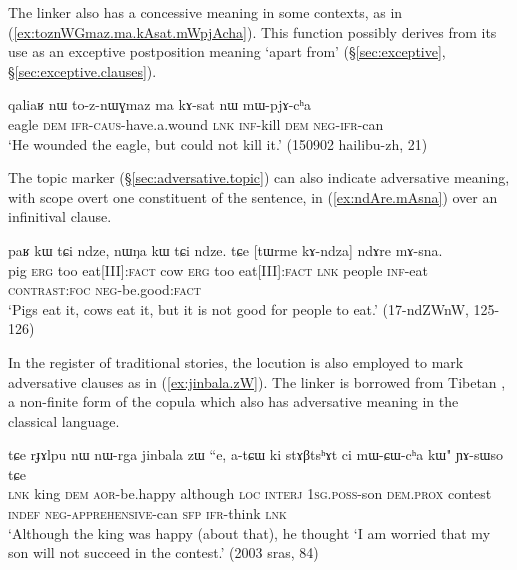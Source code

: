  The linker  also has a concessive meaning in some contexts, as in (\ref{ex:toznWGmaz.ma.kAsat.mWpjAcha}). This function possibly derives from its use as an exceptive postposition meaning `apart from' (§\ref{sec:exceptive}, §\ref{sec:exceptive.clauses}).
 
\begin{exe}
\ex \label{ex:toznWGmaz.ma.kAsat.mWpjAcha}
\gll qaliaʁ nɯ to-z-nɯɣmaz ma kɤ-sat nɯ mɯ-pjɤ-cʰa\\
eagle \textsc{dem} \textsc{ifr}-\textsc{caus}-have.a.wound \textsc{lnk} \textsc{inf}-kill \textsc{dem} \textsc{neg}-\textsc{ifr}-can\\
\glt `He wounded the eagle, but could not kill it.' (150902 hailibu-zh, 21)
\end{exe}  
 
The topic marker  (§\ref{sec:adversative.topic}) can also indicate adversative meaning, with scope overt one constituent of the sentence, in (\ref{ex:ndAre.mAsna}) over an infinitival clause.
 
\begin{exe}
\ex \label{ex:ndAre.mAsna}
\gll paʁ kɯ tɕi ndze, nɯŋa kɯ tɕi ndze. tɕe [tɯrme kɤ-ndza] ndɤre mɤ-sna.   \\
pig \textsc{erg} too eat[III]:\textsc{fact} cow  \textsc{erg} too eat[III]:\textsc{fact} \textsc{lnk} people \textsc{inf}-eat  \textsc{contrast}:\textsc{foc}  \textsc{neg}-be.good:\textsc{fact} \\
\glt `Pigs eat it, cows eat it, but it is not good for people to eat.'  (17-ndZWnW, 125-126)
\end{exe} 

In the register of traditional stories, the locution  is also employed to mark adversative clauses as in (\ref{ex:jinbala.zW}). The linker  is borrowed from Tibetan , a non-finite form of the copula  which also has adversative meaning in the classical language.

\begin{exe}
\ex \label{ex:jinbala.zW}
\gll tɕe rɟɤlpu nɯ nɯ-rga jinbala zɯ ``e, a-tɕɯ ki stɤβtsʰɤt ci mɯ-ɕɯ-cʰa kɯ" ɲɤ-sɯso tɕe \\
\textsc{lnk} king \textsc{dem} \textsc{aor}-be.happy although \textsc{loc} \textsc{interj} \textsc{1sg}.\textsc{poss}-son \textsc{dem}.\textsc{prox} contest \textsc{indef} \textsc{neg}-\textsc{apprehensive}-can \textsc{sfp} \textsc{ifr}-think \textsc{lnk} \\
\glt `Although the king was happy (about that), he thought `I am worried that my son will not succeed in the contest.' (2003 sras, 84)
\end{exe} 

